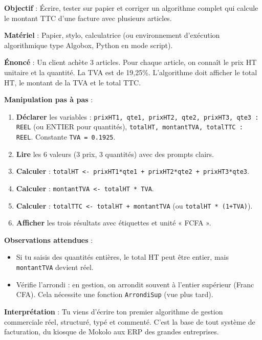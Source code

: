 \documentclass[11pt]{article}
\begin{document}
\begin{experience}
\textbf{Objectif} : Écrire, tester sur papier et corriger un algorithme complet qui calcule le montant TTC d'une facture avec plusieurs articles.

\textbf{Matériel} : Papier, stylo, calculatrice (ou environnement d'exécution algorithmique type Algobox, Python en mode script).

\textbf{Énoncé} : Un client achète 3 articles. Pour chaque article, on connaît le prix HT unitaire et la quantité. La TVA est de 19,25\%. L'algorithme doit afficher le total HT, le montant de la TVA et le total TTC.

\textbf{Manipulation pas à pas} :
\begin{enumerate}
    \item \textbf{Déclarer} les variables : \texttt{prixHT1, qte1, prixHT2, qte2, prixHT3, qte3 : REEL} (ou ENTIER pour quantités), \texttt{totalHT, montantTVA, totalTTC : REEL}. Constante \texttt{TVA = 0.1925}.
    \item \textbf{Lire} les 6 valeurs (3 prix, 3 quantités) avec des prompts clairs.
    \item \textbf{Calculer} : \texttt{totalHT <- prixHT1*qte1 + prixHT2*qte2 + prixHT3*qte3}.
    \item \textbf{Calculer} : \texttt{montantTVA <- totalHT * TVA}.
    \item \textbf{Calculer} : \texttt{totalTTC <- totalHT + montantTVA} (ou \texttt{totalHT * (1+TVA)}).
    \item \textbf{Afficher} les trois résultats avec étiquettes et unité « FCFA ».
\end{enumerate}

\textbf{Observations attendues} :
\begin{itemize}
    \item Si tu saisis des quantités entières, le total HT peut être entier, mais \texttt{montantTVA} devient réel.
    \item Vérifie l'arrondi : en gestion, on arrondit souvent à l'entier supérieur (Franc CFA). Cela nécessite une fonction \texttt{ArrondiSup} (vue plus tard).
\end{itemize}

\textbf{Interprétation} : Tu viens d'écrire ton premier algorithme de gestion commerciale réel, structuré, typé et commenté. C'est la base de tout système de facturation, du kiosque de Mokolo aux ERP des grandes entreprises.
\end{experience}
\end{document}
